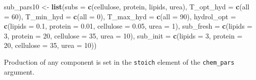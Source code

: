 \documentclass[
]{article}
\newenvironment{Shaded}{\begin{snugshade}}{\end{snugshade}}
\newcommand{\AttributeTok}[1]{\textcolor[rgb]{0.13,0.29,0.53}{#1}}
\newcommand{\DecValTok}[1]{\textcolor[rgb]{0.00,0.00,0.81}{#1}}
\newcommand{\FloatTok}[1]{\textcolor[rgb]{0.00,0.00,0.81}{#1}}
\newcommand{\FunctionTok}[1]{\textcolor[rgb]{0.13,0.29,0.53}{\textbf{#1}}}
\newcommand{\NormalTok}[1]{#1}
\newcommand{\OtherTok}[1]{\textcolor[rgb]{0.56,0.35,0.01}{#1}}
\newcommand{\StringTok}[1]{\textcolor[rgb]{0.31,0.60,0.02}{#1}}
\begin{document}
\begin{Shaded}
\begin{Highlighting}[]
\NormalTok{sub\_pars10 }\OtherTok{\textless{}{-}} \FunctionTok{list}\NormalTok{(}\AttributeTok{subs =} \FunctionTok{c}\NormalTok{(}\StringTok{\textquotesingle{}cellulose\textquotesingle{}}\NormalTok{, }\StringTok{\textquotesingle{}protein\textquotesingle{}}\NormalTok{, }\StringTok{\textquotesingle{}lipids\textquotesingle{}}\NormalTok{, }\StringTok{\textquotesingle{}urea\textquotesingle{}}\NormalTok{),}
                   \AttributeTok{T\_opt\_hyd =} \FunctionTok{c}\NormalTok{(}\AttributeTok{all =} \DecValTok{60}\NormalTok{),}
                   \AttributeTok{T\_min\_hyd =} \FunctionTok{c}\NormalTok{(}\AttributeTok{all =} \DecValTok{0}\NormalTok{),}
                   \AttributeTok{T\_max\_hyd =} \FunctionTok{c}\NormalTok{(}\AttributeTok{all =} \DecValTok{90}\NormalTok{),}
                   \AttributeTok{hydrol\_opt =} \FunctionTok{c}\NormalTok{(}\AttributeTok{lipids =} \FloatTok{0.1}\NormalTok{, }\AttributeTok{protein =} \FloatTok{0.01}\NormalTok{, }\AttributeTok{cellulose =} \FloatTok{0.05}\NormalTok{, }\AttributeTok{urea =} \DecValTok{1}\NormalTok{),}
                   \AttributeTok{sub\_fresh =} \FunctionTok{c}\NormalTok{(}\AttributeTok{lipids =} \DecValTok{3}\NormalTok{, }\AttributeTok{protein =} \DecValTok{20}\NormalTok{, }\AttributeTok{cellulose =} \DecValTok{35}\NormalTok{, }\AttributeTok{urea =} \DecValTok{10}\NormalTok{),}
                   \AttributeTok{sub\_init =} \FunctionTok{c}\NormalTok{(}\AttributeTok{lipids =} \DecValTok{3}\NormalTok{, }\AttributeTok{protein =} \DecValTok{20}\NormalTok{, }\AttributeTok{cellulose =} \DecValTok{35}\NormalTok{, }\AttributeTok{urea =} \DecValTok{10}\NormalTok{))}
\end{Highlighting}
\end{Shaded}

Production of any component is set in the \texttt{stoich} element of the
\texttt{chem\_pars} argument.
\end{document}
